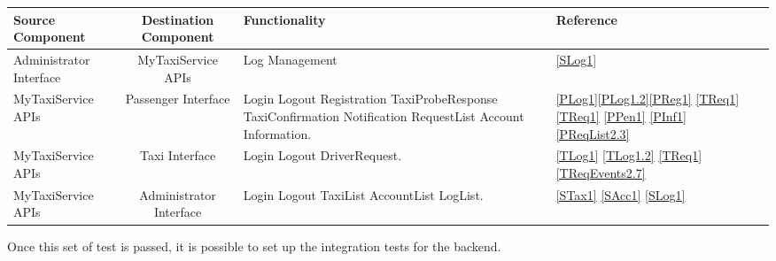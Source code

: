 \documentclass[11pt, a4paper,titlepage]{article}
\begin{document}
	\begin{tabularx}{\textwidth}{| X |c |X |X|}
		\hline \textbf{Source Component} &\textbf{ Destination Component}&\textbf{Functionality} & \textbf{Reference} \\
		\hline Administrator Interface & MyTaxiService APIs & Log Management & \ref{SLog1} \\
		\hline MyTaxiService APIs & Passenger Interface & 
		Login\newline
		Logout\newline
		Registration\newline
		TaxiProbeResponse\newline
		TaxiConfirmation\newline
		Notification\newline
		RequestList\newline
		Account Information.
		&\ref{PLog1}\newline \ref{PLog1.2}\newline \ref{PReg1} \newline \ref{TReq1} \newline \ref{TReq1} \newline \ref{PPen1} \newline \ref{PInf1} \newline \ref{PReqList2.3}\\
		\hline MyTaxiService APIs & Taxi Interface & 
		Login\newline
		Logout\newline
		DriverRequest.		
		& \ref{TLog1} \newline \ref{TLog1.2} \newline \ref{TReq1} \newline \ref{TReqEvents2.7}\\
		\hline MyTaxiService APIs & Administrator Interface & 
		Login\newline
		Logout\newline
		TaxiList\newline
		AccountList\newline
		LogList.
		& \ref{STax1} \newline \ref{SAcc1} \newline \ref{SLog1}\\
		\hline
	\end{tabularx}
	\newline
	\newline
	Once this set of test is passed, it is possible to set up the integration tests for the backend.
	\newline
	\newpage
\end{document}

